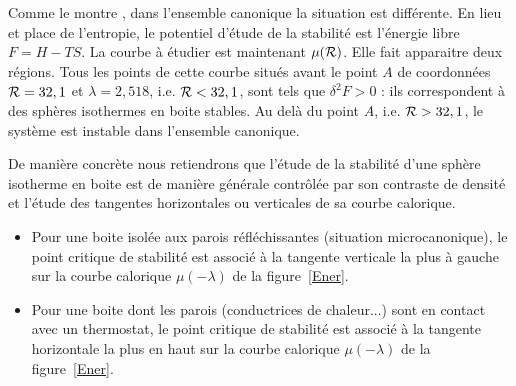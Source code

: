 	Comme le montre \cite{2002A&A...381..340C}, dans l'ensemble canonique la situation est différente. En lieu et
	place de l'entropie, le potentiel d'étude de la stabilité est l'énergie libre $F=H-TS$. La courbe à étudier est
	maintenant $\mu(\mathcal{R})$. Elle fait apparaitre deux régions. Tous les points de cette courbe situés avant le point
	$A$ de coordonnées $\mathcal{R}=32,1$ et $\lambda=2,518$, i.e. $\mathcal{R}<32,1$, sont tels que $\delta^2 F>0$ : ils
	correspondent à des sphères isothermes en boite stables. Au delà du point $A$, i.e. $\mathcal{R}>32,1$, le système est
	instable dans l'ensemble canonique.
	
	De manière concrète nous retiendrons que l'étude de la stabilité d'une sphère isotherme en boite est de manière générale contrôlée par son
	contraste de densité et l'étude des tangentes horizontales ou verticales de sa courbe calorique.   
	\begin{itemize}

		\item Pour une boite isolée aux parois réfléchissantes (situation microcanonique), le point critique de
			stabilité est associé à la tangente verticale la plus à gauche sur la courbe calorique
			$\mu(-\lambda)$ de la figure~\ref{Ener}.

		\item Pour une boite dont les parois (conductrices de chaleur...) sont en contact avec un thermostat, le
			point critique de stabilité est associé à la tangente horizontale la plus en haut sur la courbe
			calorique $\mu(-\lambda)$ de la figure~\ref{Ener}.

	\end{itemize}
	
